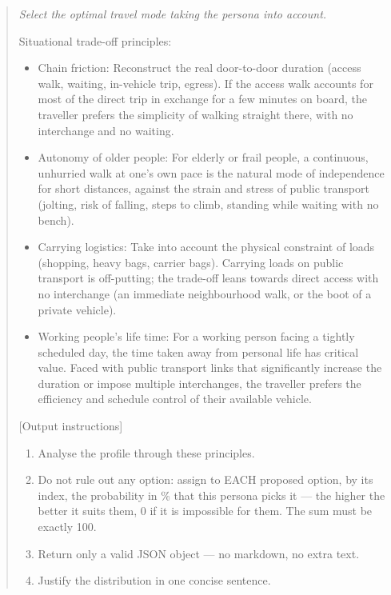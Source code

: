 \begin{quote}\small\itshape
Select the optimal travel mode taking the persona into account.

Situational trade-off principles:
\begin{itemize}\setlength{\itemsep}{2pt}
  \item Chain friction: Reconstruct the real door-to-door duration (access walk, waiting, in-vehicle trip, egress). If the access walk accounts for most of the direct trip in exchange for a few minutes on board, the traveller prefers the simplicity of walking straight there, with no interchange and no waiting.
  \item Autonomy of older people: For elderly or frail people, a continuous, unhurried walk at one's own pace is the natural mode of independence for short distances, against the strain and stress of public transport (jolting, risk of falling, steps to climb, standing while waiting with no bench).
  \item Carrying logistics: Take into account the physical constraint of loads (shopping, heavy bags, carrier bags). Carrying loads on public transport is off-putting; the trade-off leans towards direct access with no interchange (an immediate neighbourhood walk, or the boot of a private vehicle).
  \item Working people's life time: For a working person facing a tightly scheduled day, the time taken away from personal life has critical value. Faced with public transport links that significantly increase the duration or impose multiple interchanges, the traveller prefers the efficiency and schedule control of their available vehicle.
\end{itemize}

[Output instructions]
\begin{enumerate}\setlength{\itemsep}{2pt}
  \item Analyse the profile through these principles.
  \item Do not rule out any option: assign to EACH proposed option, by its index, the probability in \% that this persona picks it --- the higher the better it suits them, 0 if it is impossible for them. The sum must be exactly 100.
  \item Return only a valid JSON object --- no markdown, no extra text.
  \item Justify the distribution in one concise sentence.
\end{enumerate}
\end{quote}


